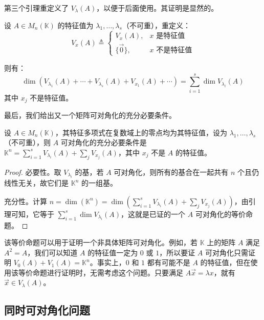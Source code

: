 第三个引理重定义了 $V_\lambda(A)$，以便于后面使用。其证明是显然的。

\begin{theorem}
	设 $A \in M_n(\mathbb K)$ 的特征值为 $\lambda_1, \ldots, \lambda_s$（不可重），重定义：
	$$
	V_x(A) \triangleq
	\begin{cases}
		V_x(A), & \text{$x$ 是特征值} \\ \{ \vec 0 \}, & \text{$x$ 不是特征值}
	\end{cases}
	$$

	则有：
	$$
	\dim(V_{\lambda_1}(A) + \cdots + V_{\lambda_s}(A) + V_{x_1}(A) + \cdots) = \sum\limits_{i = 1}^s \dim V_{\lambda_i}(A)
	$$
	其中 $x_j$ 不是特征值。
\end{theorem}

最后，我们给出又一个矩阵可对角化的充分必要条件。

\begin{theorem}
	设 $A \in M_n(\mathbb K)$，其特征多项式在复数域上的零点均为其特征值，设为 $\lambda_1, \ldots, \lambda_s$（不可重），则 $A$ 可对角化的充分必要条件是 $\mathbb K^n = \sum\limits_{i = 1}^s V_{\lambda_i}(A) + \sum\limits_{j} V_{x_j}(A)$，其中 $x_j$ 不是 $A$ 的特征值。
\end{theorem}

\begin{proof}
	必要性。取 $V_{\lambda_i}$ 的基，若 $A$ 可对角化，则所有的基合在一起共有 $n$ 个且仍线性无关，故它们是 $\mathbb K^n$ 的一组基。

	充分性。计算 $n = \dim(\mathbb K^n) = \dim \left( \sum\limits_{i = 1}^s V_{\lambda_i}(A) + \sum\limits_j V_{x_j}(A) \right)$，由引理可知，它等于 $\sum\limits_{i = 1}^s \dim V_{\lambda_i}(A)$，这就是已证的一个 $A$ 可对角化的等价命题。
\end{proof}


该等价命题可以用于证明一个非具体矩阵可对角化。例如，若 $\mathbb K$ 上的矩阵 $A$ 满足 $A^2 = A$，我们可以知道 $A$ 的特征值一定为 $0$ 或 $1$，所以要证 $A$ 可对角化只需证明 $V_0(A) + V_1(A) = \mathbb K^n$。事实上，$0$ 和 $1$ 都有可能不是 $A$ 的特征值，但在使用该等价命题进行证明时，无需考虑这个问题。只要满足 $A \vec x = \lambda x$，就有 $\vec x \in V_\lambda(A)$。

\subsection{同时可对角化问题}

